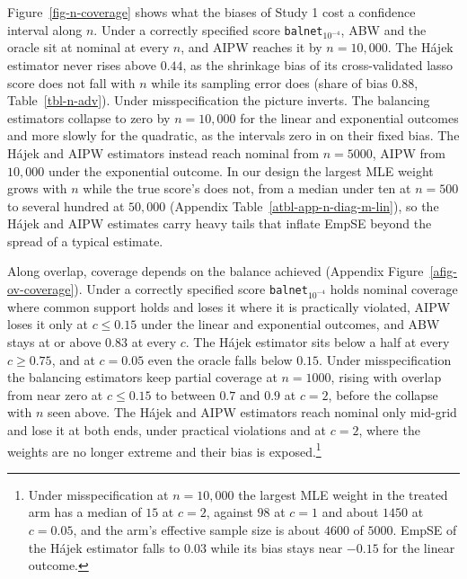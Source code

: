 \documentclass[
  12pt,
  a4paper,
]{article}
\begin{document}
Figure~\ref{fig-n-coverage} shows what the biases of Study 1 cost a
confidence interval along \(n\). Under a correctly specified score
\texttt{balnet}\(_{10^{-4}}\), ABW and the oracle sit at nominal at
every \(n\), and AIPW reaches it by \(n = 10{,}000\). The Hájek
estimator never rises above \(0.44\), as the shrinkage bias of its
cross-validated lasso score does not fall with \(n\) while its sampling
error does (share of bias \(0.88\), Table~\ref{tbl-n-adv}). Under
misspecification the picture inverts. The balancing estimators collapse
to zero by \(n = 10{,}000\) for the linear and exponential outcomes and
more slowly for the quadratic, as the intervals zero in on their fixed
bias. The Hájek and AIPW estimators instead reach nominal from
\(n = 5000\), AIPW from \(10{,}000\) under the exponential outcome. In
our design the largest MLE weight grows with \(n\) while the true
score's does not, from a median under ten at \(n = 500\) to several
hundred at \(50{,}000\) (Appendix Table~\ref{atbl-app-n-diag-m-lin}), so
the Hájek and AIPW estimates carry heavy tails that inflate EmpSE beyond
the spread of a typical estimate.

Along overlap, coverage depends on the balance achieved
(Appendix Figure~\ref{afig-ov-coverage}). Under a correctly specified
score \texttt{balnet}\(_{10^{-4}}\) holds nominal coverage where common
support holds and loses it where it is practically violated, AIPW loses
it only at \(c \le 0.15\) under the linear and exponential outcomes, and
ABW stays at or above \(0.83\) at every \(c\). The Hájek estimator sits
below a half at every \(c \ge 0.75\), and at \(c = 0.05\) even the
oracle falls below \(0.15\). Under misspecification the balancing
estimators keep partial coverage at \(n = 1000\), rising with overlap
from near zero at \(c \le 0.15\) to between \(0.7\) and \(0.9\) at
\(c = 2\), before the collapse with \(n\) seen above. The Hájek and AIPW
estimators reach nominal only mid-grid and lose it at both ends, under
practical violations and at \(c = 2\), where the weights are no longer
extreme and their bias is exposed.\footnote{Under misspecification at
  \(n = 10{,}000\) the largest MLE weight in the treated arm has a
  median of \(15\) at \(c = 2\), against \(98\) at \(c = 1\) and about
  \(1450\) at \(c = 0.05\), and the arm's effective sample size is about
  \(4600\) of \(5000\). EmpSE of the Hájek estimator falls to \(0.03\)
  while its bias stays near \(-0.15\) for the linear outcome.}
\end{document}
